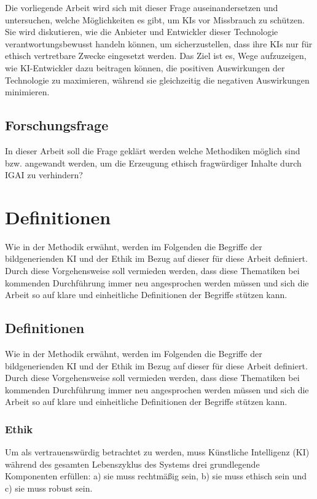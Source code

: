 \documentclass[12pt]{article}
\begin{document}
 Die vorliegende Arbeit wird sich mit dieser Frage auseinandersetzen und untersuchen, welche Möglichkeiten es gibt, um KIs vor 
 Missbrauch zu schützen. Sie wird diskutieren, wie die Anbieter und Entwickler dieser Technologie verantwortungsbewusst 
 handeln können, um sicherzustellen, dass ihre KIs nur für ethisch vertretbare Zwecke eingesetzt werden. Das Ziel ist es, 
 Wege aufzuzeigen, wie KI-Entwickler dazu beitragen können, die positiven Auswirkungen der Technologie zu maximieren, 
 während sie gleichzeitig die negativen Auswirkungen minimieren.
 \section{Forschungsfrage}
 In dieser Arbeit soll die Frage geklärt werden welche Methodiken möglich sind bzw. angewandt werden, um die Erzeugung ethisch 
 fragwürdiger Inhalte durch IGAI zu verhindern?
 

\chapter{Definitionen}
Wie in der Methodik erwähnt, werden im Folgenden die Begriffe der bildgenerienden KI und der Ethik im Bezug auf dieser für diese Arbeit definiert. 
Durch diese Vorgehensweise soll vermieden werden, dass diese Thematiken bei kommenden Durchführung immer neu angesprochen werden müssen und sich die Arbeit so auf klare und einheitliche Definitionen der Begriffe stützen kann.

\section{Definitionen}
Wie in der Methodik erwähnt, werden im Folgenden die Begriffe der bildgenerienden KI und der Ethik im Bezug auf dieser für diese Arbeit definiert. 
Durch diese Vorgehensweise soll vermieden werden, dass diese Thematiken bei kommenden Durchführung immer neu angesprochen werden müssen und sich die Arbeit so auf klare und einheitliche Definitionen der Begriffe stützen kann.

\subsection{Ethik}\label{subsection:ethicsdefinition}
Um als vertrauenswürdig betrachtet zu werden, muss Künstliche Intelligenz (KI) während des gesamten Lebenszyklus des Systems drei grundlegende Komponenten erfüllen: a) sie muss rechtmäßig sein, b) sie muss ethisch sein und c) sie muss robust sein.
\end{document}
